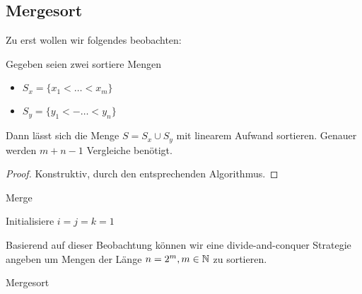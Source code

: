 \subsection{Mergesort}
Zu erst wollen wir folgendes beobachten:
\begin{lemma}
	Gegeben seien zwei sortiere Mengen
	\begin{itemize}
		\item $S_x=\{x_1<\ldots<x_m\}$
		\item $S_y=\{y_1<-\ldots<y_n\}$
	\end{itemize}
Dann lässt sich die Menge $S=S_x \cup S_y$ mit linearem Aufwand sortieren. Genauer werden $m+n-1$ Vergleiche benötigt.			
\end{lemma}
\begin{proof}
Konstruktiv, durch den entsprechenden Algorithmus.
\end{proof}
\begin{algorithm}[H]
\label{alg:merge}
\caption{Merge}
Initialisiere $i=j=k=1$ \\
\end{algorithm}
Basierend auf dieser Beobachtung können wir eine divide-and-conquer Strategie angeben um Mengen der Länge $n=2^{m}, m \in  \mathbb{N}$ zu sortieren. \\
\begin{algorithm}[H]
	\label{alg:mergesort}
	\caption{Mergesort}
\end{algorithm}
